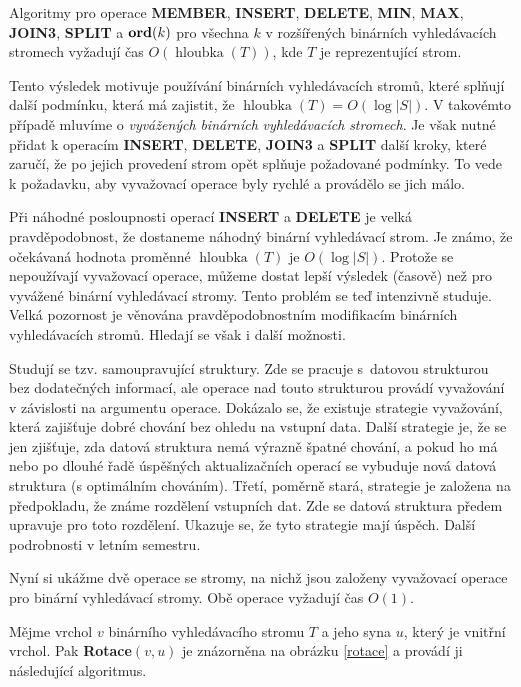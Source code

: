 \documentclass[a4paper,12pt]{article}
\DeclareMathOperator*{\hloubka}{hloubka}
\begin{document}
\begin{veta}Algoritmy pro operace {\bf MEMBER}, {\bf INSERT}, {\bf DE\-LE\-TE}, {\bf MIN}, {\bf MAX}, 
{\bf JOIN3}, {\bf SPLIT} a $\bold o\bold r\bold d(k)$ pro všechna $
k$ v rozšířených binár\-ních 
vy\-hledávacích stromech vyžadují čas $O(\hloubka
(T))$, kde $T$ je 
reprezentující strom. 
\end{veta}

Tento výsledek motivuje používání binárních 
vyhledávacích stromů, které splňují další 
podmínku, která má zajistit, že 
$\hloubka(T)=O(\log|S|)$.  V takovémto případě mluvíme o 
\emph{vyvážených} \emph{binárních} 
\emph{vyhledávacích} \emph{stromech}.  Je však nutné 
přidat k ope\-racím {\bf INSERT}, {\bf DELETE}, {\bf JOIN3} a {\bf SPLIT} další 
kroky, které 
zaručí, že po jejich provedení strom opět splňuje 
požadované podmínky.  To vede k požadavku, aby 
vyvažovací operace byly rychlé a provádělo se jich málo.  

Při náhodné posloupnosti operací {\bf INSERT} a {\bf DELETE} je 
velká pravděpodobnost, že dostaneme náhodný binární 
vy\-hledávací strom.  Je známo, že očekávaná hodnota proměn\-né 
$\hloubka(T)$ je $O(\log|S|)$.  Protože se nepoužívají vyvažovací 
operace, můžeme dostat lepší výsledek (časově) než pro 
vyvá\-žené binár\-ní vyhledávací stromy.  Tento problém se teď 
intenzivně studu\-je.  Velká pozornost je věnována 
pravděpodobnost\-ním modifikacím binárních vyhledávacích 
stromů.  Hledají se však i další možnosti.  

Studují se tzv.  samoupravující struktury.  Zde se 
pracuje s~datovou strukturou bez dodatečných informací, ale 
operace nad touto strukturou provádí vyvažování v závislosti 
na argumentu operace.  Dokázalo se, že existuje strategie 
vyvažování, která zajišťuje dobré chování bez ohledu na 
vstupní data.  Další strategie je, že se jen zjišťuje, zda datová 
struktura nemá výraz\-ně špatné chování, a pokud ho má nebo 
po dlouhé řadě úspěš\-ných aktualizačních operací se vybuduje 
nová datová struktura (s optimálním chováním).  Třetí, 
poměrně stará, strategie je zalo\-že\-na na předpokladu, že 
známe rozdělení vstupních dat.  Zde se datová struktura 
předem upravuje pro toto rozdělení.  Ukazuje se, že tyto 
strategie mají úspěch.  Další podrobnosti v letním semestru.  

Nyní si ukážme dvě operace se stromy, na nichž jsou 
založeny  vyvažovací operace pro binární vyhledávací 
stromy. Obě ope\-race vyžadují čas $O(1)$.

Mějme vrchol $v$ binárního vyhledávacího stromu $
T$ a 
jeho syna $u$, který je vnitřní vrchol.  Pak {\bf Rotace$
(v,u)$} je 
znázorněna na obrázku \ref{rotace} a provádí ji následující algoritmus.  
\end{document}
